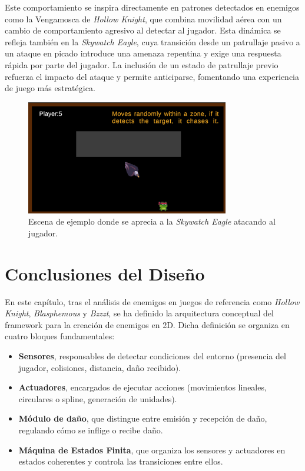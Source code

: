 Este comportamiento se inspira directamente en patrones detectados en enemigos como la Vengamosca de \textit{Hollow Knight}, que combina movilidad aérea con un cambio de comportamiento agresivo al detectar al jugador. Esta dinámica se refleja también en la \textit{Skywatch Eagle}, cuya transición desde un patrullaje pasivo a un ataque en picado introduce una amenaza repentina y exige una respuesta rápida por parte del jugador. La inclusión de un estado de patrullaje previo refuerza el impacto del ataque y permite anticiparse, fomentando una experiencia de juego más estratégica.

\begin{figure}[t]
	\centering
	\includegraphics[height=5cm]{Imagenes/AguilaCayendo.png}
	\caption{Escena de ejemplo donde se aprecia a la \textit{Skywatch Eagle} atacando al jugador.}
	\label{fig:SkywatchEagle}
\end{figure}

\section{Conclusiones del Diseño}
En este capítulo, tras el análisis de enemigos en juegos de referencia como \textit{Hollow Knight}, \textit{Blasphemous} y \textit{Bzzzt}, se ha definido la arquitectura conceptual del framework para la creación de enemigos en 2D. Dicha definición se organiza en cuatro bloques fundamentales:

\begin{itemize}
  \item \textbf{Sensores}, responsables de detectar condiciones del entorno (presencia del jugador, colisiones, distancia, daño recibido).
  \item \textbf{Actuadores}, encargados de ejecutar acciones (movimientos lineales, circulares o spline, generación de unidades).
  \item \textbf{Módulo de daño}, que distingue entre emisión y recepción de daño, regulando cómo se inflige o recibe daño.
  \item \textbf{Máquina de Estados Finita}, que organiza los sensores y actuadores en estados coherentes y controla las transiciones entre ellos.
\end{itemize}

